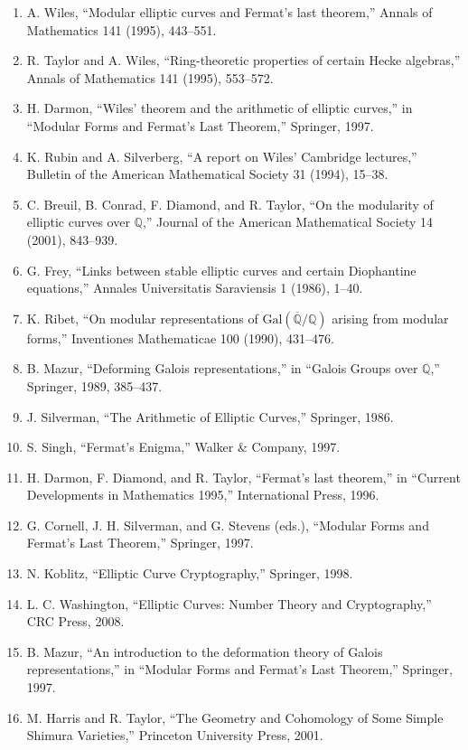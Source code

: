 \begin{enumerate}
\item A. Wiles, ``Modular elliptic curves and Fermat's last theorem,'' Annals of Mathematics 141 (1995), 443--551.
\item R. Taylor and A. Wiles, ``Ring-theoretic properties of certain Hecke algebras,'' Annals of Mathematics 141 (1995), 553--572.
\item H. Darmon, ``Wiles' theorem and the arithmetic of elliptic curves,'' in ``Modular Forms and Fermat's Last Theorem,'' Springer, 1997.
\item K. Rubin and A. Silverberg, ``A report on Wiles' Cambridge lectures,'' Bulletin of the American Mathematical Society 31 (1994), 15--38.
\item C. Breuil, B. Conrad, F. Diamond, and R. Taylor, ``On the modularity of elliptic curves over $\mathbb{Q}$,'' Journal of the American Mathematical Society 14 (2001), 843--939.
\item G. Frey, ``Links between stable elliptic curves and certain Diophantine equations,'' Annales Universitatis Saraviensis 1 (1986), 1--40.
\item K. Ribet, ``On modular representations of $\mathrm{Gal}(\overline{\mathbb{Q}}/\mathbb{Q})$ arising from modular forms,'' Inventiones Mathematicae 100 (1990), 431--476.
\item B. Mazur, ``Deforming Galois representations,'' in ``Galois Groups over $\mathbb{Q}$,'' Springer, 1989, 385--437.
\item J. Silverman, ``The Arithmetic of Elliptic Curves,'' Springer, 1986.
\item S. Singh, ``Fermat's Enigma,'' Walker \& Company, 1997.
\item H. Darmon, F. Diamond, and R. Taylor, ``Fermat's last theorem,'' in ``Current Developments in Mathematics 1995,'' International Press, 1996.
\item G. Cornell, J. H. Silverman, and G. Stevens (eds.), ``Modular Forms and Fermat's Last Theorem,'' Springer, 1997.
\item N. Koblitz, ``Elliptic Curve Cryptography,'' Springer, 1998.
\item L. C. Washington, ``Elliptic Curves: Number Theory and Cryptography,'' CRC Press, 2008.
\item B. Mazur, ``An introduction to the deformation theory of Galois representations,'' in ``Modular Forms and Fermat's Last Theorem,'' Springer, 1997.
\item M. Harris and R. Taylor, ``The Geometry and Cohomology of Some Simple Shimura Varieties,'' Princeton University Press, 2001.

\end{enumerate}
